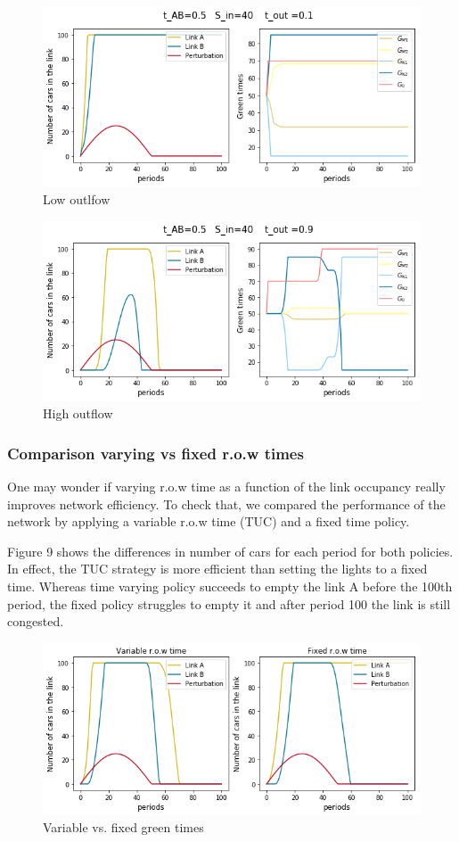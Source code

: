 \documentclass[11pt]{article}
\begin{document}
\begin{figure}[h!]
    \caption{Low outlfow}
      \centering
	\includegraphics[width=13cm]{sim3}
\end{figure}

\begin{figure}[h!]
    \caption{High outflow}
      \centering
	\includegraphics[width=13cm]{sim6}
\end{figure}

\subsubsection{Comparison varying vs fixed r.o.w times}

One may wonder if varying r.o.w time as a function of the link occupancy really improves network efficiency. To check that, we compared the performance of the network by applying a variable r.o.w time (TUC) and a fixed time policy. 

Figure 9 shows the differences in number of cars for each period for both policies. In effect, the TUC strategy is more efficient than setting the lights to a fixed time. Whereas time varying policy succeeds to empty the link A before the 100th period, the fixed policy struggles to empty it and after period 100 the link is still congested.

\begin{figure}[h!]
    \caption{Variable vs. fixed green times}
      \centering
	\includegraphics[width=12cm]{sim9}
\end{figure}
\end{document}
